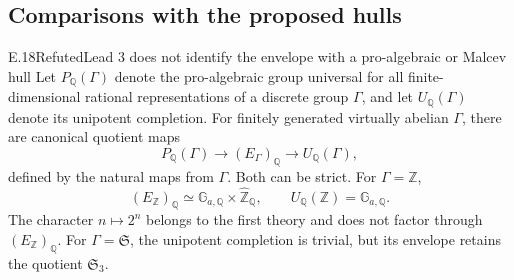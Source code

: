 \subsection{Comparisons with the proposed hulls}

\begin{statement}{E.18}{Refuted}{Lead 3 does not identify the envelope with a pro-algebraic or Malcev hull}
Let \(P_{\mathbb Q}(\Gamma)\) denote the pro-algebraic group
universal for all finite-dimensional rational representations
of a discrete group \(\Gamma\), and let \(U_{\mathbb Q}(\Gamma)\)
denote its unipotent completion.  For finitely generated
virtually abelian \(\Gamma\), there are canonical quotient maps
\[
 P_{\mathbb Q}(\Gamma)\longrightarrow(E_\Gamma)_{\mathbb Q}
                 \longrightarrow U_{\mathbb Q}(\Gamma),         \tag{E.18.1}
\]
defined by the natural maps from \(\Gamma\).  Both can be strict.
For \(\Gamma=\mathbb Z\),
\[
 (E_{\mathbb Z})_{\mathbb Q}\simeq
             \mathbb G_{a,\mathbb Q}\times\widehat{\mathbb Z}_{\mathbb Q},
 \qquad U_{\mathbb Q}(\mathbb Z)=\mathbb G_{a,\mathbb Q}.
\]
The character \(n\mapsto2^n\) belongs to the first theory and
does not factor through \((E_{\mathbb Z})_{\mathbb Q}\).
For \(\Gamma=\mathfrak S\), the unipotent completion is trivial,
but its envelope retains the quotient \(\mathfrak S_3\).
\end{statement}
